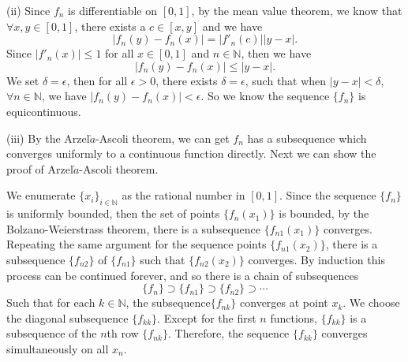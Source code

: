 \documentclass[12pt]{article}
\begin{document}
(ii) Since $f_{n}$ is differentiable on $[0, 1]$, by the mean value theorem, we know that $\forall x, y \in [0, 1]$, there exists a $c \in [x, y]$ and we have
\begin{equation*}
   |f_{n}(y) - f_{n}(x)| = |f'_{n}(c)| |y - x|.
\end{equation*}
Since $|f'_{n}(x)| \leq 1$ for all $x \in [0, 1]$ and $n \in \mathbb{N}$, then we have
\begin{equation*}
   |f_{n}(y) - f_{n}(x)| \leq |y - x|.
\end{equation*}
We set $\delta = \epsilon$, then for all $\epsilon > 0$, there exists $\delta = \epsilon$, such that when $|y - x| < \delta$, $\forall n \in \mathbb{N}$, we have $|f_{n}(y) - f_{n}(x)| < \epsilon$. So we know the sequence $\{f_{n}\}$ is equicontinuous.

(iii) By the Arzel$\grave{a}$-Ascoli theorem, we can get $f_{n}$ has a subsequence which converges uniformly to a continuous function directly. Next we can show the proof of Arzel$\grave{a}$-Ascoli theorem.

We enumerate $\{x_{i}\}_{i \in \mathbb{N}}$ as the rational number in $[0, 1]$. Since the sequence $\{f_{n}\}$ is uniformly bounded, then the set of points $\{f_{n}(x_{1})\}$ is bounded, by the Bolzano-Weierstrass theorem, there is a subsequence $\{f_{n1}(x_{1})\}$ converges. Repeating the same argument for the sequence points $\{f_{n1}(x_{2})\}$, there is a subsequence $\{f_{n2}\}$ of $\{f_{n1}\}$ such that $\{f_{n2}(x_{2})\}$ converges. By induction this process can be continued forever, and so there is a chain of subsequences
\begin{equation*}
   \{f_{n}\} \supset \{f_{n1}\} \supset \{f_{n2}\} \supset \cdots
\end{equation*}
Such that for each $k \in \mathbb{N}$, the subsequence$\{f_{nk}\}$ converges at point $x_{k}$. We choose the diagonal subsequence $\{f_{kk}\}$. Except for the first $n$ functions, $\{f_{kk}\}$ is a subsequence of the $n$th row $\{f_{nk}\}$. Therefore, the sequence $\{f_{kk}\}$ converges simultaneously on all $x_{n}$.
\end{document}
